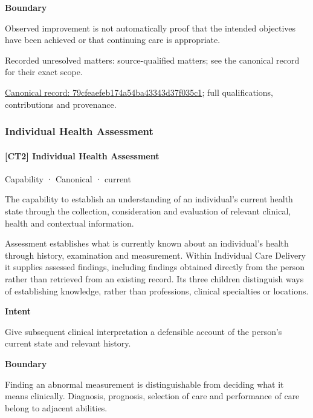 \textbf{Boundary}



Observed improvement is not automatically proof that the intended objectives have been achieved or that continuing care is appropriate.


{\small Recorded unresolved matters: source-qualified matters; see the canonical record for their exact scope.}\par
{\footnotesize \href{../../../../continuum/strategy/capability/79cfeaefeb174a54ba43343d37f035c1.md}{Canonical record: 79cfeaefeb174a54ba43343d37f035c1}; full qualifications, contributions and provenance.}\par
\subsubsection{Individual Health Assessment}

\paragraph{[CT2] Individual Health Assessment}

\label{element:045f819bb3694d3c9db7f20886e2993f}
{\small Capability · Canonical · current}\par

The capability to establish an understanding of an individual's current health state through the collection, consideration and evaluation of relevant clinical, health and contextual information.



Assessment establishes what is currently known about an individual's health through history, examination and measurement. Within Individual Care Delivery it supplies assessed findings, including findings obtained directly from the person rather than retrieved from an existing record. Its three children distinguish ways of establishing knowledge, rather than professions, clinical specialties or locations.



\textbf{Intent}



Give subsequent clinical interpretation a defensible account of the person's current state and relevant history.



\textbf{Boundary}



Finding an abnormal measurement is distinguishable from deciding what it means clinically. Diagnosis, prognosis, selection of care and performance of care belong to adjacent abilities.


